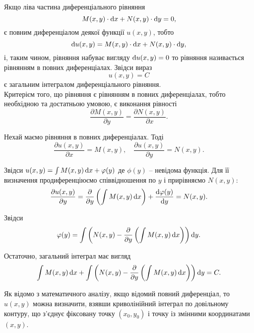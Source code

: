 Якщо ліва частина диференціального рівняння
\begin{equation*}
	M(x, y) \cdot \mathop{}\!\mathrm{d} x + N(x, y) \cdot \mathop{}\!\mathrm{d} y = 0,
\end{equation*}
є повним диференціалом деякої функції $u(x, y)$, тобто
\begin{equation*}
	\mathop{}\!\mathrm{d} u(x, y) = M(x, y) \cdot \mathop{}\!\mathrm{d} x + N(x, y) \cdot \mathop{}\!\mathrm{d} y,
\end{equation*}
і, таким чином, рівняння набуває вигляду $\mathop{}\!\mathrm{d} u (x, y) = 0$ то рівняння називається рівнянням в повних диференціалах. Звідси вираз
\begin{equation*}
	u(x, y) = C
\end{equation*}
є загальним інтегралом диференціального рівняння. \\

Критерієм того, що рівняння є рівнянням в повних диференціалах, тобто необхідною та достатньою умовою, є виконання рівності
\begin{equation*}
	\frac{\partial M(x, y)}{\partial y} = \frac{\partial N(x, y)}{\partial x}.
\end{equation*}
 
Нехай маємо рівняння в повних диференціалах. Тоді
\begin{equation*}
	\frac{\partial u(x, y)}{\partial x} = M(x, y), \quad \frac{\partial u(x, y)}{\partial y} = N(x, y).
\end{equation*}

Звідси $u(x, y) = \int M(x, y) \mathop{}\!\mathrm{d} x + \varphi(y)$ де $\phi(y)$ -- невідома функція. Для її визначення продиференціюємо співвідношення по $y$ і прирівняємо $N(x, y)$:
\begin{equation*}
	\frac{\partial u(x, y)}{\partial y} = \frac{\partial}{\partial y} \left( \int M(x, y) \mathop{}\!\mathrm{d} x \right) + \frac{\mathop{}\!\mathrm{d} \varphi(y)}{\mathop{}\!\mathrm{d} y} = N(x, y).
\end{equation*}

Звідси
\begin{equation*}
	\varphi(y) = \int \left( N(x, y) - \frac{\partial}{\partial y} \left( \int M(x, y) \mathop{}\!\mathrm{d} x \right) \right) \mathop{}\!\mathrm{d} y.
\end{equation*}

Остаточно, загальний інтеграл має вигляд
\begin{equation*}
	\int M(x, y) \mathop{}\!\mathrm{d} x + \int \left( N(x, y) - \frac{\partial}{\partial y} \left( \int M(x, y) \mathop{}\!\mathrm{d} x \right) \right) \mathop{}\!\mathrm{d} y = C.
\end{equation*}

Як відомо з математичного аналізу, якщо відомий повний диференціал, то $u(x, y)$ можна визначити, взявши криволінійний інтеграл по довільному контуру, що з'єднує фіксовану точку $(x_0, y_0)$ і точку із змінними координатами $(x, y)$. \\

